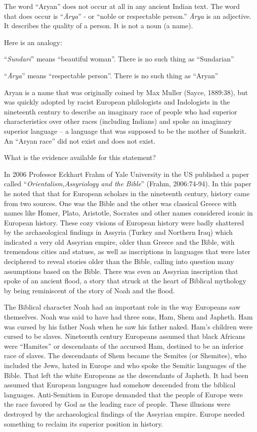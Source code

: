 The word “Aryan” does not occur at all in any ancient Indian text. The word that does occur is “\textit{Ārya}” - or “noble or respectable person.” \textit{Ārya} is an adjective. It describes the quality of a person. It is not a noun (a name).

Here is an analogy:

“\textit{Sundarī}” means “beautiful woman”. There is no such thing as “Sundarian”

“\textit{Ārya}” means “respectable person”. There is no such thing as “Aryan”

Aryan is a name that was originally coined by Max Muller (Sayce, 1889:38), but was quickly adopted by racist European philologists and Indologists in the nineteenth century to describe an imaginary race of people who had superior characteristics over other races (including Indians) and spoke an imaginary superior language – a language that was supposed to be the mother of Sanskrit. An “Aryan race” did not exist and does not exist.

What is the evidence available for this statement?

In 2006 Professor Eckhart Frahm of Yale University in the US published a paper called “\textit{Orientalism,Assyriology and the Bible}” (Frahm, 2006:74-94). In this paper he noted that that for European scholars in the nineteenth century, history came from two sources. One was the Bible and the other was classical Greece with names like Homer, Plato, Aristotle, Socrates and other names considered iconic in European history. These cozy visions of European history were badly shattered by the archaeological findings in Assyria (Turkey and Northern Iraq) which indicated a very old Assyrian empire, older than Greece and the Bible, with tremendous cities and statues, as well as inscriptions in languages that were later deciphered to reveal stories older than the Bible, calling into question many assumptions based on the Bible. There was even an Assyrian inscription that spoke of an ancient flood, a story that struck at the heart of Biblical mythology by being reminiscent of the story of Noah and the flood.

The Biblical character Noah had an important role in the way Europeans saw themselves. Noah was said to have had three sons, Ham, Shem and Japheth. Ham was cursed by his father Noah when he saw his father naked. Ham’s children were cursed to be slaves. Nineteenth century Europeans assumed that black Africans were “Hamites” or descendants of the accursed Ham, destined to be an inferior race of slaves. The descendants of Shem became the Semites (or Shemites), who included the Jews, hated in Europe and who spoke the Semitic languages of the Bible. That left the white Europeans as the descendants of Japheth. It had been assumed that European languages had somehow descended from the biblical languages. Anti-Semitism in Europe demanded that the people of Europe were the race favored by God as the leading race of people. These illusions were destroyed by the archaeological findings of the Assyrian empire. Europe needed something to reclaim its superior position in history.

